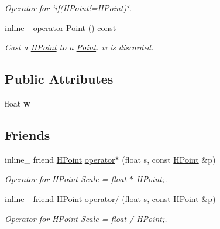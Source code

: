 \begin{DoxyCompactItemize}
\begin{DoxyCompactList}\small\item\em Operator for \char`\"{}if(\+H\+Point!=\+H\+Point)\char`\"{}. \end{DoxyCompactList}\item 
\hypertarget{class_h_point_ad9341f4d7fbdf8f5e15b8bea0a49305e}{inline\+\_\+ \hyperlink{class_h_point_ad9341f4d7fbdf8f5e15b8bea0a49305e}{operator Point} () const }\label{class_h_point_ad9341f4d7fbdf8f5e15b8bea0a49305e}

\begin{DoxyCompactList}\small\item\em Cast a \hyperlink{class_h_point}{H\+Point} to a \hyperlink{class_point}{Point}. w is discarded. \end{DoxyCompactList}\end{DoxyCompactItemize}
\subsection*{Public Attributes}
\begin{DoxyCompactItemize}
\item 
\hypertarget{class_h_point_a3d75bd98937cbdfefad4efa0c1761ec4}{float {\bfseries w}}\label{class_h_point_a3d75bd98937cbdfefad4efa0c1761ec4}

\end{DoxyCompactItemize}
\subsection*{Friends}
\begin{DoxyCompactItemize}
\item 
\hypertarget{class_h_point_a1bf5d9b145d44fedc8cf73ffcd3ba4ce}{inline\+\_\+ friend \hyperlink{class_h_point}{H\+Point} \hyperlink{class_h_point_a1bf5d9b145d44fedc8cf73ffcd3ba4ce}{operator$\ast$} (float s, const \hyperlink{class_h_point}{H\+Point} \&p)}\label{class_h_point_a1bf5d9b145d44fedc8cf73ffcd3ba4ce}

\begin{DoxyCompactList}\small\item\em Operator for \hyperlink{class_h_point}{H\+Point} Scale = float $\ast$ \hyperlink{class_h_point}{H\+Point};. \end{DoxyCompactList}\item 
\hypertarget{class_h_point_a55dfa9a54972eb6849952bf355ebca45}{inline\+\_\+ friend \hyperlink{class_h_point}{H\+Point} \hyperlink{class_h_point_a55dfa9a54972eb6849952bf355ebca45}{operator/} (float s, const \hyperlink{class_h_point}{H\+Point} \&p)}\label{class_h_point_a55dfa9a54972eb6849952bf355ebca45}

\begin{DoxyCompactList}\small\item\em Operator for \hyperlink{class_h_point}{H\+Point} Scale = float / \hyperlink{class_h_point}{H\+Point};. \end{DoxyCompactList}\end{DoxyCompactItemize}


